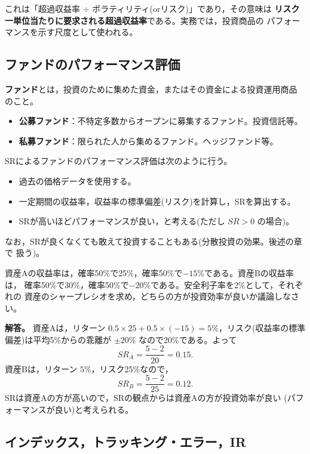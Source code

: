 これは「超過収益率 $\div$ ボラティリティ(orリスク)」であり，その意味は
\textbf{リスク一単位当たりに要求される超過収益率}である。実務では，投資商品の
パフォーマンスを示す尺度として使われる。

\subsection{ファンドのパフォーマンス評価}

\begin{definition}[ファンド]
\textbf{ファンド}とは，投資のために集めた資金，またはその資金による投資運用商品
のこと。
\begin{itemize}
\item \textbf{公募ファンド}：不特定多数からオープンに募集するファンド。投資信託等。
\item \textbf{私募ファンド}：限られた人から集めるファンド。ヘッジファンド等。
\end{itemize}
\end{definition}

SRによるファンドのパフォーマンス評価は次のように行う。
\begin{itemize}
\item 過去の価格データを使用する。
\item 一定期間の収益率，収益率の標準偏差(リスク)を計算し，SRを算出する。
\item SRが高いほどパフォーマンスが良い，と考える(ただし $SR>0$ の場合)。
\end{itemize}
なお，SRが良くなくても敢えて投資することもある(分散投資の効果。後述の章で
扱う)。

\begin{example}[例題4-3]
資産Aの収益率は，確率50\%で25\%，確率50\%で$-15\%$である。資産Bの収益率は，
確率50\%で30\%，確率50\%で$-20\%$である。安全利子率を2\%として，それぞれの
資産のシャープレシオを求め，どちらの方が投資効率が良いか議論しなさい。

\medskip
\noindent\textbf{解答。}
資産Aは，リターン $0.5\times 25 + 0.5\times(-15) = 5\%$，リスク(収益率の標準
偏差)は平均5\%からの乖離が $\pm 20\%$ なので20\%である。よって
\[
SR_A = \frac{5-2}{20} = 0.15.
\]
資産Bは，リターン $5\%$，リスク25\%なので，
\[
SR_B = \frac{5-2}{25} = 0.12.
\]
SRは資産Aの方が高いので，SRの観点からは資産Aの方が投資効率が良い
(パフォーマンスが良い)と考えられる。
\end{example}

\vspace{18pt}

\subsection{インデックス，トラッキング・エラー，IR}

